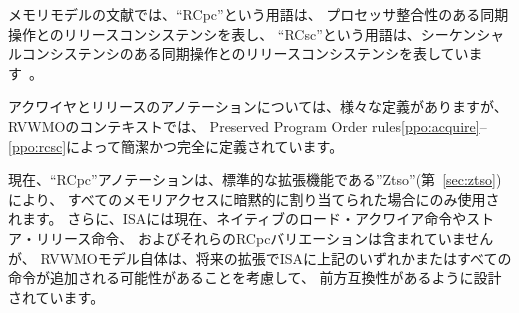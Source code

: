 \begin{commentary}
\begin{comment}
  In the memory model literature, the term ``RCpc'' stands for release consistency with processor-consistent synchronization operations, and the term ``RCsc'' stands for release consistency with sequentially-consistent synchronization operations~\cite{Gharachorloo90memoryconsistency}.
\end{comment}
  メモリモデルの文献では、``RCpc''という用語は、
プロセッサ整合性のある同期操作とのリリースコンシステンシを表し、
``RCsc''という用語は、シーケンシャルコンシステンシのある同期操作とのリリースコンシステンシを表しています~\cite{Gharachorloo90memoryconsistency}。

\begin{comment}
  While there are many different definitions for acquire and release annotations in the literature, in the context of RVWMO these terms are concisely and completely defined by Preserved Program Order rules \ref{ppo:acquire}--\ref{ppo:rcsc}.
\end{comment}
  アクワイヤとリリースのアノテーションについては、様々な定義がありますが、RVWMOのコンテキストでは、
Preserved Program Order rules\ref{ppo:acquire}--\ref{ppo:rcsc}によって簡潔かつ完全に定義されています。

\begin{comment}
  ``RCpc'' annotations are currently only used when implicitly assigned to every memory access per the standard extension ``Ztso'' (Chapter~\ref{sec:ztso}).  Furthermore, although the ISA does not currently contain native load-acquire or store-release instructions, nor RCpc variants thereof, the RVWMO model itself is designed to be forwards-compatible with the potential addition of any or all of the above into the ISA in a future extension.
\end{comment}
  現在、``RCpc''アノテーションは、標準的な拡張機能である''Ztso''(第~\ref{sec:ztso})により、
すべてのメモリアクセスに暗黙的に割り当てられた場合にのみ使用されます。 
さらに、ISAには現在、ネイティブのロード・アクワイア命令やストア・リリース命令、
およびそれらのRCpcバリエーションは含まれていませんが、
RVWMOモデル自体は、将来の拡張でISAに上記のいずれかまたはすべての命令が追加される可能性があることを考慮して、
前方互換性があるように設計されています。
\end{commentary}


\begin{comment}
\subsection*{Syntactic Dependencies}
\end{comment}
